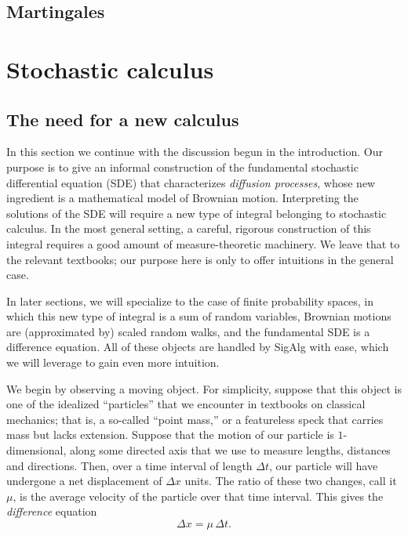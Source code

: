 \documentclass[11pt]{book}
\theoremstyle{definition}
\numberwithin{equation}{section}
\begin{document}
\section{Martingales}

\chapter{Stochastic calculus}

\section{The need for a new calculus}

In this section we continue with the discussion begun in the introduction. Our purpose is to give an informal construction of the fundamental stochastic differential equation (SDE) that characterizes \textit{diffusion processes}, whose new ingredient is a mathematical model of Brownian motion. Interpreting the solutions of the SDE will require a new type of integral belonging to stochastic calculus. In the most general setting, a careful, rigorous construction of this integral requires a good amount of measure-theoretic machinery. We leave that to the relevant textbooks; our purpose here is only to offer intuitions in the general case.

In later sections, we will specialize to the case of finite probability spaces, in which this new type of integral is a sum of random variables, Brownian motions are (approximated by) scaled random walks, and the fundamental SDE is a difference equation. All of these objects are handled by SigAlg with ease, which we will leverage to gain even more intuition.

We begin by observing a moving object. For simplicity, suppose that this object is one of the idealized ``particles'' that we encounter in textbooks on classical mechanics; that is, a so-called ``point mass,'' or a featureless speck that carries mass but lacks extension. Suppose that the motion of our particle is $1$-dimensional, along some directed axis that we use to measure lengths, distances and directions. Then, over a time interval of length $\Delta t$, our particle will have undergone a net displacement of $\Delta x$ units. The ratio of these two changes, call it $\mu$, is the average velocity of the particle over that time interval. This gives the \textit{difference} equation
\[
	\Delta x = \mu \, \Delta t.
\]
\end{document}

